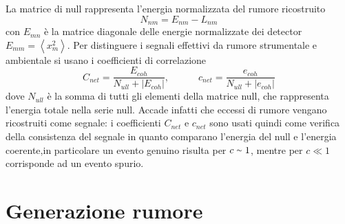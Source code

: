La matrice di null rappresenta l'energia normalizzata del rumore ricostruito
\begin{equation}
	N_{nm} = E_{nm}-L_{nm}
\end{equation}
con $E_{mn}$  è la matrice diagonale delle energie normalizzate dei detector $E_{mm}  = \left<x_m^2\right>$. Per distinguere i segnali effettivi da rumore strumentale e ambientale si usano i coefficienti di correlazione 
\begin{equation}
	C_{net} = \frac{E_{coh}}{N_{ull}+|E_{coh}|}, \quad\quad\quad c_{net} = \frac{e_{coh}}{N_{ull}+|e_{coh}|}
	\label{eqn:coefficient_energy}
\end{equation}
dove $N_{ull}$ è la somma di tutti gli elementi della matrice null, che rappresenta l'energia totale nella serie null. Accade infatti che eccessi di rumore vengano ricostruiti come segnale: i coefficienti $C_{net}$ e $c_{net}$ sono usati quindi come verifica della consistenza del segnale in quanto comparano l'energia del null e l'energia coerente\cite{Klimenko_2008},in particolare un evento genuino risulta per $c\smallsim 1$, mentre per $c \ll 1$ corrisponde ad un evento spurio\cite{Klimenko_2016}.
\section{Generazione rumore}
\label{section:noise_generation}





%
%

